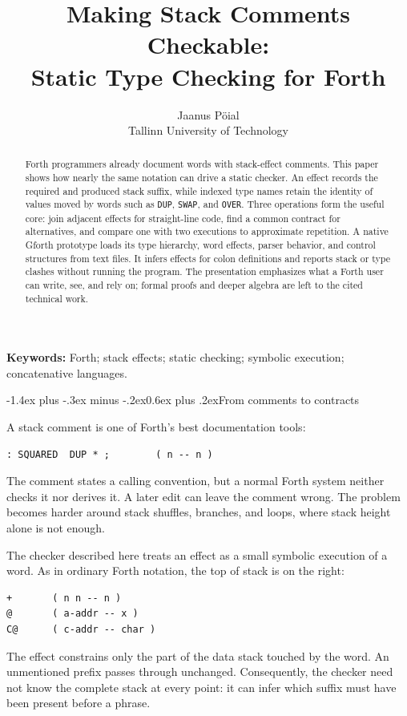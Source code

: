 \documentclass[a4paper,10pt]{article}
\title{Making Stack Comments Checkable:\\Static Type Checking for Forth}
\author{Jaanus Pöial\\Tallinn University of Technology}
\date{}
\makeatletter
\renewcommand\section{\@startsection{section}{1}{\z@}%
  {-1.4ex plus -.3ex minus -.2ex}{0.6ex plus .2ex}{\large\bfseries}}
\makeatother
\begin{document}
\maketitle
\vspace{-1.5em}

\begin{abstract}
Forth programmers already document words with stack-effect comments.  This
paper shows how nearly the same notation can drive a static checker.  An effect
records the required and produced stack suffix, while indexed type names retain
the identity of values moved by words such as \texttt{DUP}, \texttt{SWAP}, and
\texttt{OVER}.  Three operations form the useful core: join adjacent effects
for straight-line code, find a common contract for alternatives, and compare
one with two executions to approximate repetition.  A native Gforth prototype
loads its type hierarchy, word effects, parser behavior, and control structures
from text files.  It infers effects for colon definitions and reports stack or
type clashes without running the program.  The presentation emphasizes what a
Forth user can write, see, and rely on; formal proofs and deeper algebra are
left to the cited technical work.
\end{abstract}

\noindent\textbf{Keywords:} Forth; stack effects; static checking; symbolic
execution; concatenative languages.

\section{From comments to contracts}

A stack comment is one of Forth's best documentation tools:
\begin{lstlisting}
: SQUARED  DUP * ;        ( n -- n )
\end{lstlisting}
The comment states a calling convention, but a normal Forth system neither
checks it nor derives it.  A later edit can leave the comment wrong.  The
problem becomes harder around stack shuffles, branches, and loops, where stack
height alone is not enough.

The checker described here treats an effect as a small symbolic execution of a
word.  As in ordinary Forth notation, the top of stack is on the right:
\begin{lstlisting}
+       ( n n -- n )
@       ( a-addr -- x )
C@      ( c-addr -- char )
\end{lstlisting}
The effect constrains only the part of the data stack touched by the word.  An
unmentioned prefix passes through unchanged.  Consequently, the checker need
not know the complete stack at every point: it can infer which suffix must have
been present before a phrase.
\end{document}
